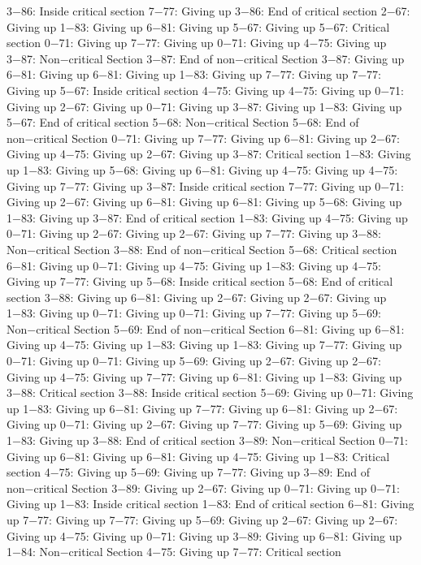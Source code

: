 3−86: Inside critical section
7−77: Giving up
3−86: End of critical section
2−67: Giving up
1−83: Giving up
6−81: Giving up
5−67: Giving up
5−67: Critical section
0−71: Giving up
7−77: Giving up
0−71: Giving up
4−75: Giving up
3−87: Non−critical Section
3−87: End of non−critical Section
3−87: Giving up
6−81: Giving up
6−81: Giving up
1−83: Giving up
7−77: Giving up
7−77: Giving up
5−67: Inside critical section
4−75: Giving up
4−75: Giving up
0−71: Giving up
2−67: Giving up
0−71: Giving up
3−87: Giving up
1−83: Giving up
5−67: End of critical section
5−68: Non−critical Section
5−68: End of non−critical Section
0−71: Giving up
7−77: Giving up
6−81: Giving up
2−67: Giving up
4−75: Giving up
2−67: Giving up
3−87: Critical section
1−83: Giving up
1−83: Giving up
5−68: Giving up
6−81: Giving up
4−75: Giving up
4−75: Giving up
7−77: Giving up
3−87: Inside critical section
7−77: Giving up
0−71: Giving up
2−67: Giving up
6−81: Giving up
6−81: Giving up
5−68: Giving up
1−83: Giving up
3−87: End of critical section
1−83: Giving up
4−75: Giving up
0−71: Giving up
2−67: Giving up
2−67: Giving up
7−77: Giving up
3−88: Non−critical Section
3−88: End of non−critical Section
5−68: Critical section
6−81: Giving up
0−71: Giving up
4−75: Giving up
1−83: Giving up
4−75: Giving up
7−77: Giving up
5−68: Inside critical section
5−68: End of critical section
3−88: Giving up
6−81: Giving up
2−67: Giving up
2−67: Giving up
1−83: Giving up
0−71: Giving up
0−71: Giving up
7−77: Giving up
5−69: Non−critical Section
5−69: End of non−critical Section
6−81: Giving up
6−81: Giving up
4−75: Giving up
1−83: Giving up
1−83: Giving up
7−77: Giving up
0−71: Giving up
0−71: Giving up
5−69: Giving up
2−67: Giving up
2−67: Giving up
4−75: Giving up
7−77: Giving up
6−81: Giving up
1−83: Giving up
3−88: Critical section
3−88: Inside critical section
5−69: Giving up
0−71: Giving up
1−83: Giving up
6−81: Giving up
7−77: Giving up
6−81: Giving up
2−67: Giving up
0−71: Giving up
2−67: Giving up
7−77: Giving up
5−69: Giving up
1−83: Giving up
3−88: End of critical section
3−89: Non−critical Section
0−71: Giving up
6−81: Giving up
6−81: Giving up
4−75: Giving up
1−83: Critical section
4−75: Giving up
5−69: Giving up
7−77: Giving up
3−89: End of non−critical Section
3−89: Giving up
2−67: Giving up
0−71: Giving up
0−71: Giving up
1−83: Inside critical section
1−83: End of critical section
6−81: Giving up
7−77: Giving up
7−77: Giving up
5−69: Giving up
2−67: Giving up
2−67: Giving up
4−75: Giving up
0−71: Giving up
3−89: Giving up
6−81: Giving up
1−84: Non−critical Section
4−75: Giving up
7−77: Critical section
